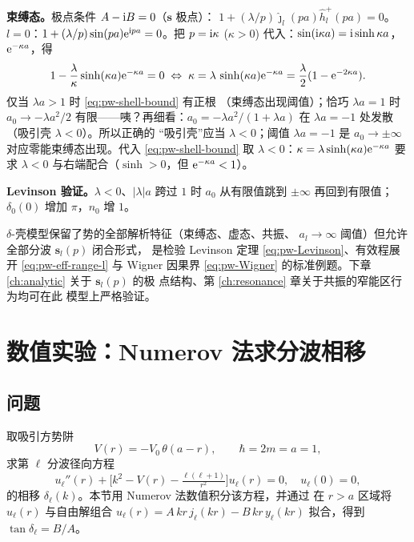 \textbf{束缚态。}极点条件 $A-\mathrm{i} B=0$（$\mathbf s$ 极点）：
$1+(\lambda/p)\hat\jmath_l(pa)\hat h_l^+(pa)=0$。
$l=0$：$1+(\lambda/p)\sin(pa)\mathrm{e}^{\mathrm{i} pa}=0$。把 $p=\mathrm{i}\kappa$
($\kappa>0$) 代入：$\sin(\mathrm{i}\kappa a)=\mathrm{i}\sinh\kappa a$，
$\mathrm{e}^{-\kappa a}$，得
\begin{equation}\label{eq:pw-shell-bound}
1-\frac{\lambda}{\kappa}\sinh(\kappa a)\mathrm{e}^{-\kappa a}=0
\;\Leftrightarrow\;
\kappa=\lambda\,\sinh(\kappa a)\mathrm{e}^{-\kappa a}
=\frac{\lambda}{2}(1-\mathrm{e}^{-2\kappa a}).
\end{equation}
仅当 $\lambda a>1$ 时 \eqref{eq:pw-shell-bound} 有正根
（束缚态出现阈值）；恰巧 $\lambda a=1$ 时 $a_0\to-\lambda a^2/2$
有限——咦？再细看：$a_0=-\lambda a^2/(1+\lambda a)$ 在
$\lambda a=-1$ 处发散（吸引壳 $\lambda<0$）。所以正确的
“吸引壳”应当 $\lambda<0$；阈值 $\lambda a=-1$ 是 $a_0\to\pm\infty$
对应零能束缚态出现。代入 \eqref{eq:pw-shell-bound} 取
$\lambda<0$：$\kappa=\lambda\sinh(\kappa a)\mathrm{e}^{-\kappa a}$
要求 $\lambda<0$ 与右端配合（$\sinh>0$，但 $\mathrm{e}^{-\kappa a}<1$）。

\textbf{Levinson 验证。}$\lambda<0$、$|\lambda|a$ 跨过 $1$ 时
$a_0$ 从有限值跳到 $\pm\infty$ 再回到有限值；$\delta_0(0)$
增加 $\pi$，$n_0$ 增 $1$。

\begin{remark}
$\delta$-壳模型保留了势的全部解析特征（束缚态、虚态、共振、
$a_l\to\infty$ 阈值）但允许全部分波 $\mathbf s_l(p)$ 闭合形式，
是检验 Levinson 定理 \eqref{eq:pw-Levinson}、有效程展开
\eqref{eq:pw-eff-range-l} 与 Wigner 因果界 \eqref{eq:pw-Wigner}
的标准例题。下章 \ref{ch:analytic} 关于 $\mathbf s_l(p)$ 的极
点结构、第 \ref{ch:resonance} 章关于共振的窄能区行为均可在此
模型上严格验证。
\end{remark}

\section{数值实验：Numerov 法求分波相移}\label{sec:numexp-ch10}

\subsection*{问题}
取吸引方势阱
\[
  V(r)=-V_0\,\theta(a-r),\qquad \hbar=2m=a=1,
\]
求第 $\ell$ 分波径向方程
\[
  u_\ell''(r)+\bigl[k^2-V(r)-\tfrac{\ell(\ell+1)}{r^2}\bigr]u_\ell(r)=0,
  \quad u_\ell(0)=0,
\]
的相移 $\delta_\ell(k)$。本节用 Numerov 法数值积分该方程，并通过
在 $r>a$ 区域将 $u_\ell(r)$ 与自由解组合
$u_\ell(r)=A\,kr\,j_\ell(kr)-B\,kr\,y_\ell(kr)$ 拟合，得到
$\tan\delta_\ell=B/A$。


